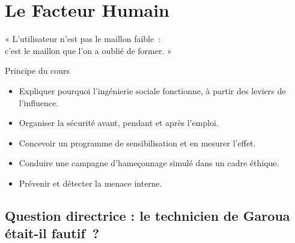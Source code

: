 
\chapter{Le Facteur Humain}
\label{chap:humain}

\epigraph{%
    « L'utilisateur n'est pas le maillon faible~:\\
    c'est le maillon que l'on a oublié de former. »%
}{Principe du cours}


\begin{boxobjectifs}
\begin{itemize}
    \item Expliquer pourquoi l'ingénierie sociale fonctionne, à partir
          des leviers de l'influence.
    \item Organiser la sécurité avant, pendant et après l'emploi.
    \item Concevoir un programme de sensibilisation et en mesurer l'effet.
    \item Conduire une campagne d'hameçonnage simulé dans un cadre éthique.
    \item Prévenir et détecter la menace interne.
\end{itemize}
\end{boxobjectifs}

\bigskip

\section*{Question directrice : le technicien de Garoua était-il fautif~?}

